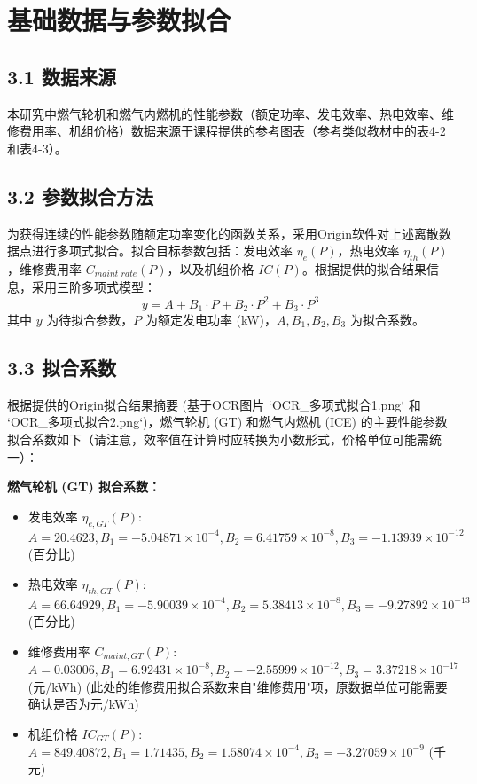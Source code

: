 \documentclass[12pt]{ctexart}
\begin{document}
\section{基础数据与参数拟合}
\subsection{3.1 数据来源}
本研究中燃气轮机和燃气内燃机的性能参数（额定功率、发电效率、热电效率、维修费用率、机组价格）数据来源于课程提供的参考图表（参考类似教材中的表4-2和表4-3）。

\subsection{3.2 参数拟合方法}
为获得连续的性能参数随额定功率变化的函数关系，采用Origin软件对上述离散数据点进行多项式拟合。拟合目标参数包括：发电效率 $\eta_e(P)$，热电效率 $\eta_{th}(P)$，维修费用率 $C_{maint\_rate}(P)$，以及机组价格 $IC(P)$。根据提供的拟合结果信息，采用三阶多项式模型：
\[ y = A + B_1 \cdot P + B_2 \cdot P^2 + B_3 \cdot P^3 \]
其中 $y$ 为待拟合参数，$P$ 为额定发电功率 (kW)，$A, B_1, B_2, B_3$ 为拟合系数。

\subsection{3.3 拟合系数}
根据提供的Origin拟合结果摘要 (基于OCR图片 `OCR\_多项式拟合1.png` 和 `OCR\_多项式拟合2.png`)，燃气轮机 (GT) 和燃气内燃机 (ICE) 的主要性能参数拟合系数如下（请注意，效率值在计算时应转换为小数形式，价格单位可能需统一）：

\textbf{燃气轮机 (GT) 拟合系数：}
\begin{itemize}
    \item 发电效率 $\eta_{e,GT}(P)$: $A=20.4623, B_1=-5.04871 \times 10^{-4}, B_2=6.41759 \times 10^{-8}, B_3=-1.13939 \times 10^{-12}$ (百分比)
    \item 热电效率 $\eta_{th,GT}(P)$: $A=66.64929, B_1=-5.90039 \times 10^{-4}, B_2=5.38413 \times 10^{-8}, B_3=-9.27892 \times 10^{-13}$ (百分比)
    \item 维修费用率 $C_{maint,GT}(P)$: $A=0.03006, B_1=6.92431 \times 10^{-8}, B_2=-2.55999 \times 10^{-12}, B_3=3.37218 \times 10^{-17}$ (元/kWh) (此处的维修费用拟合系数来自"维修费用"项，原数据单位可能需要确认是否为元/kWh)
    \item 机组价格 $IC_{GT}(P)$: $A=849.40872, B_1=1.71435, B_2=1.58074 \times 10^{-4}, B_3=-3.27059 \times 10^{-9}$ (千元)
\end{itemize}
\end{document}
